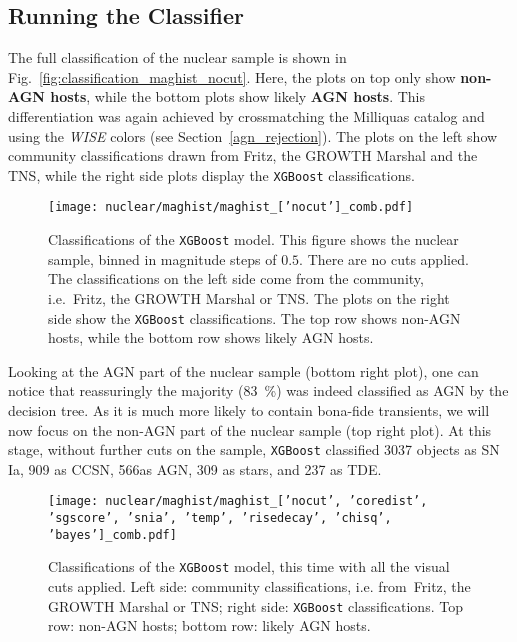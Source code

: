 \subsection{Running the Classifier}
The full classification of the nuclear sample is shown in Fig.~\ref{fig:classification_maghist_nocut}. Here, the plots on top only show \textbf{non-AGN hosts}, while the bottom plots show likely \textbf{AGN hosts}. This differentiation was again achieved by crossmatching the Milliquas catalog and using the \textit{WISE} colors (see Section~\ref{agn_rejection}). The plots on the left show community classifications drawn from Fritz, the GROWTH Marshal and the TNS, while the right side plots display the \texttt{XGBoost} classifications.

\begin{figure}[H]
  \texttt{[image: nuclear/maghist/maghist\_['nocut']\_comb.pdf]}
  \caption[Classification without cuts]{Classifications of the \texttt{XGBoost} model. This figure shows the nuclear sample, binned in magnitude steps of $0.5$. There are no cuts applied. The classifications on the left side come from the community, i.e.~Fritz, the GROWTH Marshal or TNS. The plots on the right side show the \texttt{XGBoost} classifications. The top row shows non-AGN hosts, while the bottom row shows likely AGN hosts.}
\end{figure}

Looking at the AGN part of the nuclear sample (bottom right plot), one can notice that reassuringly the majority (\SI{83}{\percent}) was indeed classified as AGN by the decision tree. As it is much more likely to contain bona-fide transients, we will now focus on the non-AGN part of the nuclear sample (top right plot). At this stage, without further cuts on the sample, \texttt{XGBoost} classified 3037 objects as SN Ia, 909 as CCSN, 566as AGN, 309 as stars, and 237 as TDE.

\begin{figure}[htpb]
  \texttt{[image: nuclear/maghist/maghist\_['nocut', 'coredist', 'sgscore', 'snia', 'temp', 'risedecay', 'chisq', 'bayes']\_comb.pdf]}
  \caption[Classification with all visual cuts]{Classifications of the \texttt{XGBoost} model, this time with all the visual cuts applied. Left side: community classifications, i.e. from~Fritz, the GROWTH Marshal or TNS; right side: \texttt{XGBoost} classifications. Top row: non-AGN hosts; bottom row: likely AGN hosts.}
\end{figure}

